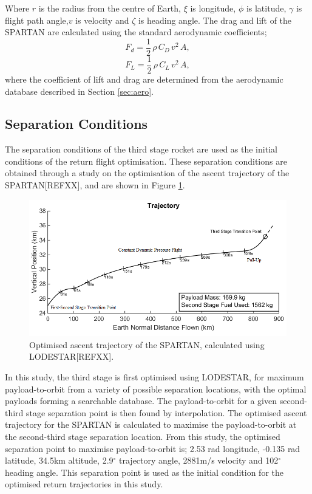 \documentclass[conf]{new-aiaa}
\begin{document}
Where $r$ is the radius from the centre of Earth, $\xi$ is longitude, $\phi$ is latitude, $\gamma$ is flight path angle,$v$ is velocity and $\zeta$ is heading angle. The drag and lift of the SPARTAN are calculated using the standard aerodynamic coefficients;
\begin{equation}
F_d = \frac{1}{2} \, \rho \, C_D \, v^2 \, A ,
\end{equation}
\begin{equation}
F_L = \frac{1}{2} \, \rho \, C_L \, v^2 \, A ,
\end{equation}
where the coefficient of lift and drag are determined from the aerodynamic database described in Section \ref{sec:aero}.

\subsection{Separation Conditions}
The separation conditions of the third stage rocket are used as the initial conditions of the return flight optimisation. These separation conditions are obtained through a study on the optimisation of the ascent trajectory of the SPARTAN[REFXX], and are shown in Figure \ref*{fig:qlimited50kpa}.
\begin{figure}[ht]
	\centering
	\includegraphics[width=0.6\linewidth]{Figures/qlimited50kpa}
	\caption{Optimised ascent trajectory of the SPARTAN, calculated using LODESTAR[REFXX].}
	\label{fig:qlimited50kpa}
\end{figure}
 In this study, the third stage is first optimised using LODESTAR, for maximum payload-to-orbit from a variety of possible separation locations, with the optimal payloads forming a searchable database. The payload-to-orbit for a given second-third stage separation point is then found by interpolation. The optimised ascent trajectory for the SPARTAN is calculated to maximise the payload-to-orbit at the second-third stage separation location. From this study, the optimised separation point to maximise payload-to-orbit is; 2.53 rad longitude, -0.135 rad latitude, 34.5km altitude, 2.9$^\circ$ trajectory angle, 2881m/s velocity and 102$^\circ$ heading angle. This separation point is used as the initial condition for the optimised return trajectories in this study.  
\end{document}
